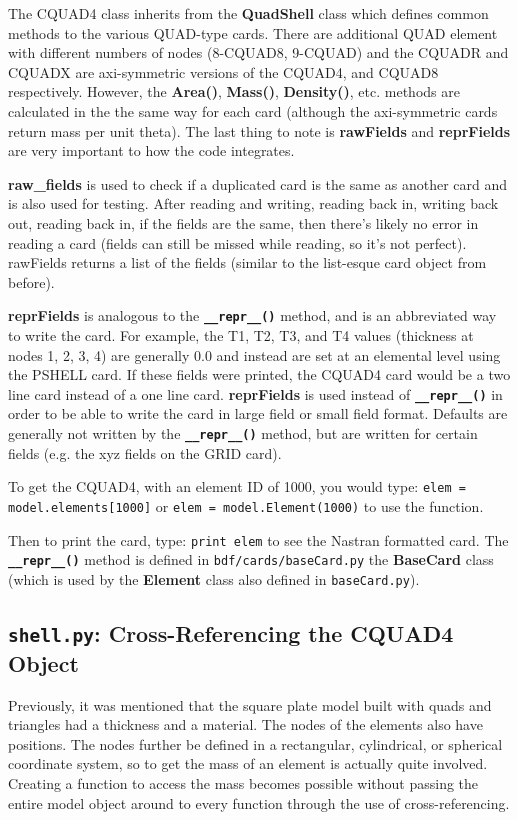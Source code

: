      The CQUAD4 class inherits from the {\bf QuadShell} class which defines common methods to the various QUAD-type cards.  There are additional QUAD element with different numbers of nodes (8-CQUAD8, 9-CQUAD) and the CQUADR and CQUADX are axi-symmetric versions of the CQUAD4, and CQUAD8 respectively.  However, the {\bf Area()}, {\bf Mass()}, {\bf Density()}, etc. methods are calculated in the the same way for each card (although the axi-symmetric cards return mass per unit theta).  The last thing to note is {\bf rawFields} and {\bf reprFields} are very important to how the code integrates.
     
     {\bf raw_fields} is used to check if a duplicated card is the same as another card and is also used for testing.  After reading and writing, reading back in, writing back out, reading back in, if the fields are the 
     same, then there's likely no error in reading a card (fields can still be missed while reading, so it's not perfect).  rawFields returns a list of the fields (similar to the list-esque card object from before).
     
     {\bf reprFields} is analogous to the {\bf \tt \_\_repr\_\_()} method, and is an abbreviated way to write the card.  For example, the T1, T2, T3, and T4 values (thickness at nodes 1, 2, 3, 4) are generally 0.0 and instead are set at an elemental level using the PSHELL card.  If these fields were printed, the CQUAD4 card would be a two line card instead of a one line card.  {\bf reprFields} is used instead of {\bf \tt \_\_repr\_\_()} in order to be able to write the card in large field or small field format.  Defaults are generally not written by the {\bf \tt \_\_repr\_\_()} method, but are written for certain fields (e.g. the xyz fields on the GRID card).
    
     To get the CQUAD4, with an element ID of 1000, you would type:
       {\tt elem = model.elements[1000]} or
       {\tt elem = model.Element(1000)} to use the function.
     
     Then to print the card, type:
       {\tt print elem}
     to see the Nastran formatted card.  The {\bf \tt \_\_repr\_\_()} method is defined in {\tt bdf/cards/baseCard.py} the {\bf BaseCard} class (which is used by the {\bf Element} class also defined in {\tt baseCard.py}).

 \subsection{{\tt shell.py}: Cross-Referencing the CQUAD4 Object}
     Previously, it was mentioned that the square plate model built with quads and triangles had a thickness and a material.  The nodes of the elements also have positions.  The nodes further be defined in a rectangular, cylindrical, or spherical coordinate system, so to get the mass of an element is actually quite involved.  Creating a function to access the mass becomes possible without passing the entire model object around to every function through the use of cross-referencing.
     
